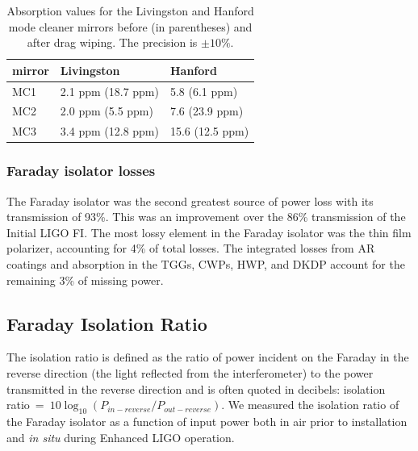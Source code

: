 \begin{table}
\centering
\caption[Absorption values for the Livingston and Hanford mode
 cleaner mirrors]{Absorption values for the Livingston and Hanford mode
 cleaner mirrors before (in parentheses) and after drag wiping. The precision is $\pm 10\%$.} 
\begin{tabular}{l l l}
\hline
mirror & Livingston & Hanford\\
\hline
MC1 & 2.1 ppm (18.7 ppm) & 5.8 (6.1 ppm) \\
MC2 & 2.0 ppm (5.5 ppm) & 7.6 (23.9 ppm) \\
MC3 & 3.4 ppm (12.8 ppm) & 15.6 (12.5 ppm) \\
\hline
\end{tabular}
\label{tab:MCabsorption2}
\end{table}


\subsubsection{Faraday isolator losses} 
The Faraday isolator was the second greatest source of power loss with
its transmission of 93\%. This was an improvement over the
86\% transmission of the Initial LIGO FI. The most lossy element in the
Faraday isolator was the thin film polarizer, accounting for 4\% of
total losses. The integrated losses from AR coatings and absorption in the
TGGs, CWPs, HWP, and DKDP account for the remaining 3\% of missing power. 


\subsection{Faraday Isolation Ratio}
The isolation ratio is defined as the ratio of power incident on the
Faraday in the reverse direction (the light reflected from the
interferometer) to the power transmitted in the 
reverse direction and is often quoted in decibels: isolation ratio~=~$10
\log_{10}(P_{in-reverse}/P_{out-reverse})$.  We measured the isolation ratio of the
Faraday isolator as a function of input power both in air prior to
installation and \emph{in situ} during Enhanced LIGO operation.

